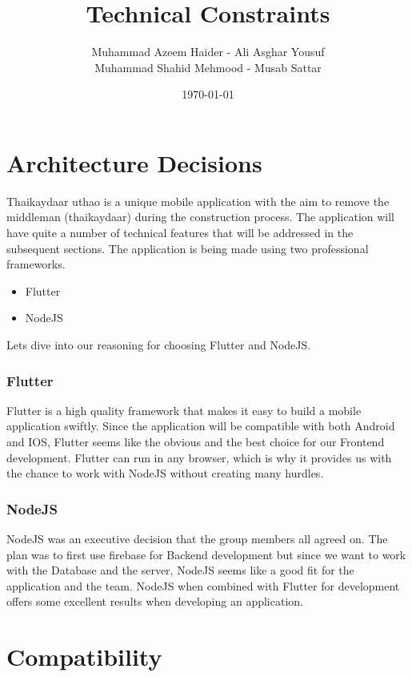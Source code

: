 \documentclass[12pt]{report}
\title{Technical Constraints}
\author{Muhammad Azeem Haider - Ali Asghar Yousuf \\
        Muhammad Shahid Mehmood - Musab Sattar}
\date{\today}
\begin{document}
\maketitle

\newpage

\section*{Architecture Decisions}

Thaikaydaar uthao is a unique mobile application with the aim to remove the middleman (thaikaydaar) during the construction process. The application will have quite a number of technical features that will be addressed in the subsequent sections. The application is being made using two professional frameworks. 

\begin{itemize}

        \item Flutter 
        \item NodeJS

\end{itemize}

Lets dive into our reasoning for choosing Flutter and NodeJS. 

\subsubsection*{Flutter}

Flutter is a high quality framework that makes it easy to build a mobile application swiftly. Since the application will be compatible with both Android and IOS, Flutter seems like the obvious and the best choice for our Frontend development. Flutter can run in any browser, which is why it provides us with the chance to work with NodeJS without creating many hurdles.  

\subsubsection*{NodeJS}

NodeJS was an executive decision that the group members all agreed on. The plan was to first use firebase for Backend development but since we want to work with the Database and the server, NodeJS seems like a good fit for the application and the team. NodeJS when combined with Flutter for development offers some excellent results when developing an application. 

\section*{Compatibility}
\end{document}
